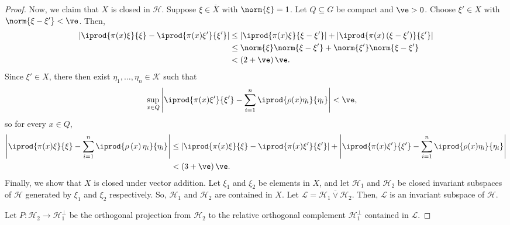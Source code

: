 \documentclass[10pt]{mypackage}
\begin{document}
\begin{proof}
  Now, we claim that $X$  is closed in $\mathscr{H}$. Suppose $\xi\in \overline{X}$ with $\norm{\xi} = 1$. Let $Q\subseteq G$ be compact and $\ve > 0$. Choose $\xi'\in X$ with $\norm{\xi-\xi'} < \ve$. Then,
  \begin{align*}
    \left\vert \iprod{\pi(x)\xi}{\xi} - \iprod{\pi(x)\xi'}{\xi'} \right\vert &\leq \left\vert \iprod{\pi(x)\xi}{\xi-\xi'} \right\vert + \left\vert \iprod{\pi(x)\left( \xi-\xi' \right)}{\xi'} \right\vert\\
                             &\leq \norm{\xi}\norm{\xi-\xi'} + \norm{\xi'}\norm{\xi-\xi'}\\
                             &< \left( 2 + \ve \right)\ve.
  \end{align*}
  Since $\xi'\in X$, there then exist $\eta_1,\dots,\eta_n\in \mathscr{K}$ such that
  \begin{align*}
    \sup_{x\in Q}\left\vert \iprod{\pi(x)\xi'}{\xi'} - \sum_{i=1}^{n} \iprod{\rho(x)\eta_i}{\eta_i} \right\vert &< \ve,
  \end{align*}
  so for every $x\in Q$,
  \begin{align*}
    \left\vert \iprod{\pi(x)\xi}{\xi} - \sum_{i=1}^{n} \iprod{\rho\left( x \right)\eta_i}{\eta_i} \right\vert &\leq \left\vert \iprod{\pi(x)\xi}{\xi} - \iprod{\pi(x)\xi'}{\xi'} \right\vert + \left\vert \iprod{\pi(x)\xi'}{\xi'} - \sum_{i=1}^{n} \iprod{\rho(x)\eta_i}{\eta_i} \right\vert\\
                          & < \left( 3 + \ve \right)\ve.
  \end{align*}
  Finally, we show that $X$ is closed under vector addition. Let $\xi_1$ and $\xi_2$ be elements in $X$, and let $\mathscr{H}_1$ and $\mathscr{H}_2$ be closed invariant subspaces of $ \mathscr{H} $ generated by $\xi_1$ and $\xi_2$ respectively. So, $\mathscr{H}_1$ and $\mathscr{H}_2$ are contained in $X$. Let $ \mathscr{L} = \overline{\mathscr{H}_1 \vee \mathscr{H}_2} $. Then, $ \mathscr{L} $ is an invariant subspace of $ \mathscr{H} $.

  Let $P\colon \mathscr{H}_2\to \mathscr{H}_1^{\perp}$ be the orthogonal projection from $ \mathscr{H}_2 $ to the relative orthogonal complement $\mathscr{H}_1^{\perp}$ contained in $\mathscr{L}$. 
\end{proof}
\end{document}
